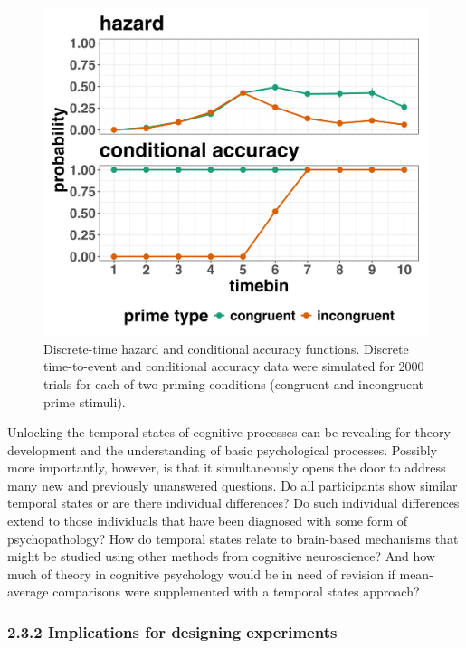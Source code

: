 \documentclass[
  man, donotrepeattitle,floatsintext]{apa6}
\begin{document}
\begin{figure}[H]

{\centering \includegraphics[width=0.8\linewidth,height=0.67\textheight,]{../sims/figures/haz_acc_single} 

}

\caption{Discrete-time hazard and conditional accuracy functions. Discrete time-to-event and conditional accuracy data were simulated for 2000 trials for each of two priming conditions (congruent and incongruent prime stimuli).}\label{fig:plot3}
\end{figure}

Unlocking the temporal states of cognitive processes can be revealing for theory development and the understanding of basic psychological processes. Possibly more importantly, however, is that it simultaneously opens the door to address many new and previously unanswered questions. Do all participants show similar temporal states or are there individual differences? Do such individual differences extend to those individuals that have been diagnosed with some form of psychopathology? How do temporal states relate to brain-based mechanisms that might be studied using other methods from cognitive neuroscience? And how much of theory in cognitive psychology would be in need of revision if mean-average comparisons were supplemented with a temporal states approach?

\subsubsection{2.3.2 Implications for designing experiments}\label{implications-for-designing-experiments}
\end{document}
